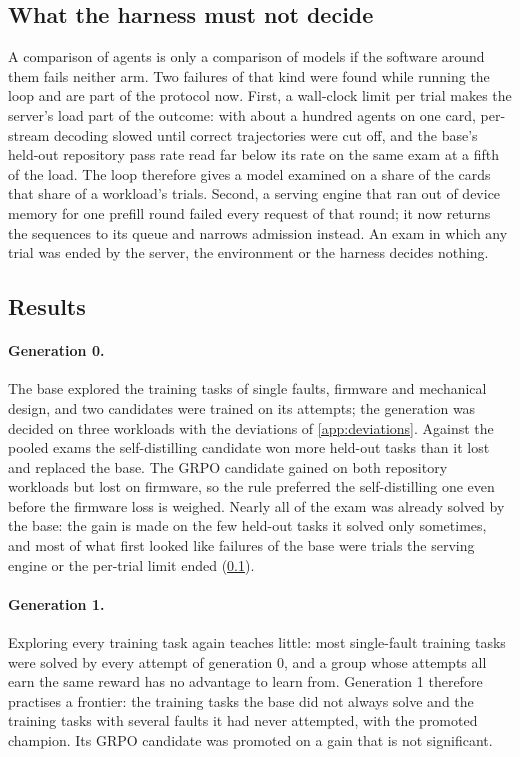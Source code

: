 \subsection{What the harness must not decide}\label{sec:generations-harness}

A comparison of agents is only a comparison of models if the software around them fails neither
arm. Two failures of that kind were found while running the loop and are part of the protocol now.
First, a wall-clock limit per trial makes the server's load part of the outcome: with about a
hundred agents on one card, per-stream decoding slowed until correct trajectories were cut off, and
the base's held-out repository pass rate read far below its rate on the same exam at a fifth of the
load. The loop therefore gives a model examined on a share of the cards that share of a workload's trials.
Second, a serving engine that ran out of device memory for one prefill round failed every request
of that round; it now returns the sequences to its queue and narrows admission instead. An exam in
which any trial was ended by the server, the environment or the harness decides nothing.

\subsection{Results}

\paragraph{Generation 0.} The base explored the training tasks of single faults, firmware and
mechanical design, and two candidates were trained on its attempts; the generation was decided on
three workloads with the deviations of \cref{app:deviations}. Against the pooled exams the
self-distilling candidate won more held-out tasks than it lost and replaced the base. The GRPO candidate gained on both repository workloads but lost on firmware, so the
rule preferred the self-distilling one even before the firmware loss is weighed. Nearly
all of the exam was already solved by the base: the gain is made on the few held-out tasks it
solved only sometimes, and most of what first looked like failures of the base were trials the
serving engine or the per-trial limit ended (\cref{sec:generations-harness}).

\paragraph{Generation 1.} Exploring every training task again teaches little: most single-fault
training tasks were solved by every attempt of generation 0, and a group whose attempts all earn the
same reward has no advantage to learn from. Generation 1 therefore practises a frontier:
the training tasks the base did not always solve and the training tasks with several faults it had
never attempted, with the promoted champion. Its GRPO candidate was promoted on a gain that is
not significant.

